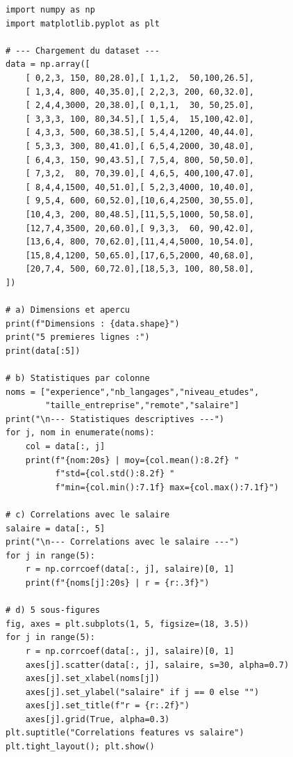 \begin{pythonbox}
\begin{lstlisting}
import numpy as np
import matplotlib.pyplot as plt

# --- Chargement du dataset ---
data = np.array([
    [ 0,2,3, 150, 80,28.0],[ 1,1,2,  50,100,26.5],
    [ 1,3,4, 800, 40,35.0],[ 2,2,3, 200, 60,32.0],
    [ 2,4,4,3000, 20,38.0],[ 0,1,1,  30, 50,25.0],
    [ 3,3,3, 100, 80,34.5],[ 1,5,4,  15,100,42.0],
    [ 4,3,3, 500, 60,38.5],[ 5,4,4,1200, 40,44.0],
    [ 5,3,3, 300, 80,41.0],[ 6,5,4,2000, 30,48.0],
    [ 6,4,3, 150, 90,43.5],[ 7,5,4, 800, 50,50.0],
    [ 7,3,2,  80, 70,39.0],[ 4,6,5, 400,100,47.0],
    [ 8,4,4,1500, 40,51.0],[ 5,2,3,4000, 10,40.0],
    [ 9,5,4, 600, 60,52.0],[10,6,4,2500, 30,55.0],
    [10,4,3, 200, 80,48.5],[11,5,5,1000, 50,58.0],
    [12,7,4,3500, 20,60.0],[ 9,3,3,  60, 90,42.0],
    [13,6,4, 800, 70,62.0],[11,4,4,5000, 10,54.0],
    [15,8,4,1200, 50,65.0],[17,6,5,2000, 40,68.0],
    [20,7,4, 500, 60,72.0],[18,5,3, 100, 80,58.0],
])

# a) Dimensions et apercu
print(f"Dimensions : {data.shape}")
print("5 premieres lignes :")
print(data[:5])

# b) Statistiques par colonne
noms = ["experience","nb_langages","niveau_etudes",
        "taille_entreprise","remote","salaire"]
print("\n--- Statistiques descriptives ---")
for j, nom in enumerate(noms):
    col = data[:, j]
    print(f"{nom:20s} | moy={col.mean():8.2f} "
          f"std={col.std():8.2f} "
          f"min={col.min():7.1f} max={col.max():7.1f}")

# c) Correlations avec le salaire
salaire = data[:, 5]
print("\n--- Correlations avec le salaire ---")
for j in range(5):
    r = np.corrcoef(data[:, j], salaire)[0, 1]
    print(f"{noms[j]:20s} | r = {r:.3f}")

# d) 5 sous-figures
fig, axes = plt.subplots(1, 5, figsize=(18, 3.5))
for j in range(5):
    r = np.corrcoef(data[:, j], salaire)[0, 1]
    axes[j].scatter(data[:, j], salaire, s=30, alpha=0.7)
    axes[j].set_xlabel(noms[j])
    axes[j].set_ylabel("salaire" if j == 0 else "")
    axes[j].set_title(f"r = {r:.2f}")
    axes[j].grid(True, alpha=0.3)
plt.suptitle("Correlations features vs salaire")
plt.tight_layout(); plt.show()
\end{lstlisting}
\end{pythonbox}

